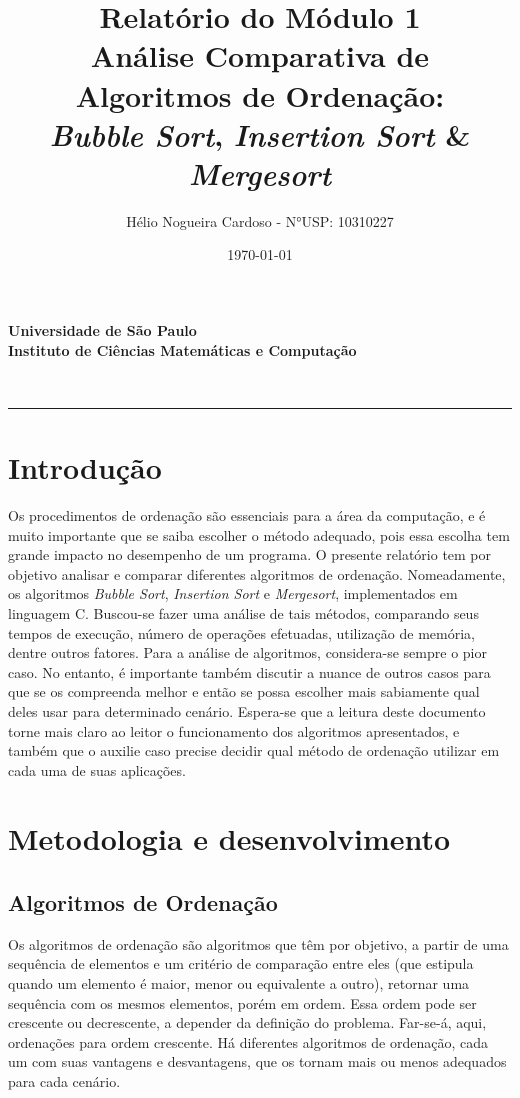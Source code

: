 \documentclass[fontsize=10pt]{article}
\title{\Large{Relatório do Módulo 1}\\
\large{\textbf{Análise Comparativa de Algoritmos de Ordenação:}}\\
\textbf{\textit{Bubble Sort}, \textit{Insertion Sort} \& \textit{Mergesort}\\}
}
\author{\vspace{15pt} Hélio Nogueira Cardoso - N°USP: 10310227}
\date{\today}
\makeatletter
\renewenvironment{abstract} %
 {\small
  \begin{center}
  \bfseries \abstractname\vspace{-.5em}\vspace{0pt}
  \end{center}
  \list{}{%
    \setlength{\leftmargin}{0mm}
    \setlength{\rightmargin}{\leftmargin}%
  }
  \item\relax}
 {\endlist}
\renewcommand{\maketitle}{\bgroup\setlength{\parindent}{0pt}%
\begin{center}
    \textbf{
      Universidade de São Paulo\\
      Instituto de Ciências Matemáticas e Computação
    }
\end{center}
\begin{flushleft}
  \textbf{\@title}
  \@author\\
  [3pt] 
  \@date
\end{flushleft}\egroup
}
\makeatother
\begin{document}
\maketitle
 
\begin{abstract}

\end{abstract}

\rule{\linewidth}{0.5pt}

\section{Introdução}
\label{int}

Os procedimentos de ordenação são essenciais para a área da computação, e é muito importante que se saiba escolher o método adequado, pois essa escolha tem grande impacto no desempenho de um programa. O presente relatório tem por objetivo analisar e comparar diferentes algoritmos de ordenação. Nomeadamente, os algoritmos \textit{Bubble Sort}, \textit{Insertion Sort} e \textit{Mergesort}, implementados em linguagem C. Buscou-se fazer uma análise de tais métodos, comparando seus tempos de execução, número de operações efetuadas, utilização de memória, dentre outros fatores. Para a análise de algoritmos, considera-se sempre o pior caso. No entanto, é importante também discutir a nuance de outros casos para que se os compreenda melhor e então se possa escolher mais sabiamente qual deles usar para determinado cenário. Espera-se que a leitura deste documento torne mais claro ao leitor o funcionamento dos algoritmos apresentados, e também que o auxilie caso precise decidir qual método de ordenação utilizar em cada uma de suas aplicações.

\section{Metodologia e desenvolvimento}

\subsection{Algoritmos de Ordenação}
Os algoritmos de ordenação são algoritmos que têm por objetivo, a partir de uma sequência de elementos e um critério de comparação entre eles (que estipula quando um elemento é maior, menor ou equivalente a outro), retornar uma sequência com os mesmos elementos, porém em ordem. Essa ordem pode ser crescente ou decrescente, a depender da definição do problema. Far-se-á, aqui, ordenações para ordem crescente. Há diferentes algoritmos de ordenação, cada um com suas vantagens e desvantagens, que os tornam mais ou menos adequados para cada cenário.\\
\end{document}
